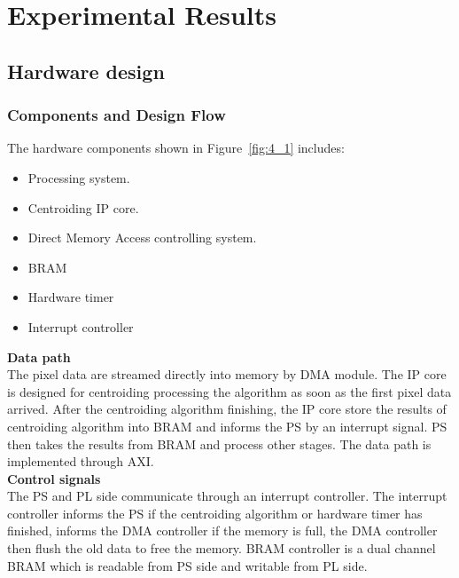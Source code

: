 \chapter{Experimental Results}
\label{chap:result}

\section{Hardware design}

\subsection{Components and Design Flow}

The hardware components shown in Figure~\ref{fig:4_1} includes:
\begin{itemize}
    \item Processing system.
    \item Centroiding IP core.
    \item Direct Memory Access controlling system.
    \item BRAM
    \item Hardware timer
    \item Interrupt controller
\end{itemize}


\noindent \textbf{Data path} \\
\noindent The pixel data are streamed directly into memory by DMA module. The IP core is designed for centroiding processing the algorithm as soon as the first pixel data arrived. After the centroiding algorithm finishing, the IP core store the results of centroiding algorithm into BRAM and informs the PS by an interrupt signal. PS then takes the results from BRAM and process other stages. The data path is implemented through AXI. \\

\noindent \textbf{Control signals} \\
\noindent The PS and PL side communicate through an interrupt controller. The interrupt controller informs the PS if the centroiding algorithm or hardware timer has finished, informs the DMA controller if the memory is full, the DMA controller then flush the old data to free the memory. BRAM controller is a dual channel BRAM which is readable from PS side and writable from PL side. \\

